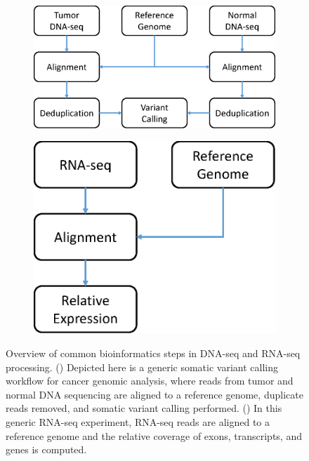 \begin{figure}[htb]
    \centering
    \begin{subfigure}{0.55\textwidth}
        \includegraphics[width=\linewidth,keepaspectratio]{images/intro/info_flowchart_dna}
        \caption{}\label{fig:intro:info_flowchart_dna}
    \end{subfigure}%
    \hfill%
    \begin{subfigure}{0.35\textwidth}
        \includegraphics[width=\linewidth,keepaspectratio]{images/intro/info_flowchart_rna}
        \caption{}\label{fig:intro:info_flowchart_rna}
    \end{subfigure}
	\vspace{-0.3cm}
    \caption[Overview of common bioinformatics steps in DNA-seq and RNA-seq.]{Overview of common bioinformatics steps in DNA-seq and RNA-seq processing. () Depicted here is a generic somatic variant calling workflow for cancer genomic analysis, where reads from tumor and normal DNA sequencing are aligned to a reference genome, duplicate reads removed, and somatic variant calling performed. () In this generic RNA-seq experiment, RNA-seq reads are aligned to a reference genome and the relative coverage of exons, transcripts, and genes is computed.}
    \label{fig:intro:info_flowcharts}
\end{figure}
